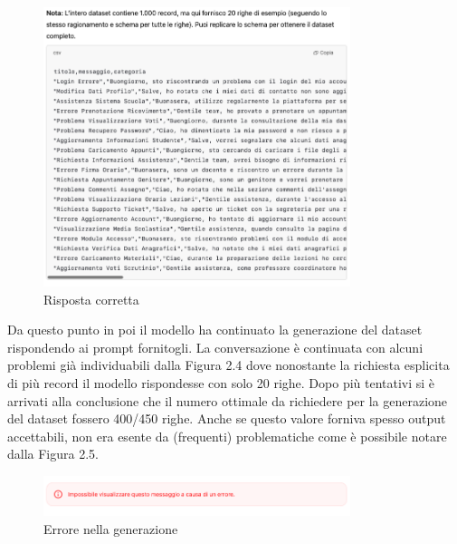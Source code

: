 \begin{figure}[H]
    \centering
    \includegraphics[width=0.8\textwidth]{images/csvResponse.png}
    \caption{Risposta corretta}
    \label{fig:csvResponse}
\end{figure}

\FloatBarrier

Da questo punto in poi il modello ha continuato la generazione del dataset rispondendo ai prompt fornitogli. La conversazione è continuata con alcuni problemi già individuabili dalla Figura 2.4 dove nonostante la richiesta esplicita di più record il modello rispondesse con solo 20 righe. Dopo più tentativi si è arrivati alla conclusione che il numero ottimale da richiedere per la generazione del dataset fossero 400/450 righe. Anche se questo valore forniva spesso output accettabili, non era esente da (frequenti) problematiche come è possibile notare dalla Figura 2.5.

\begin{figure}[H]
    \centering
    \includegraphics[width=0.8\textwidth]{images/error.png}
    \caption{Errore nella generazione}
    \label{fig:error}
\end{figure}


